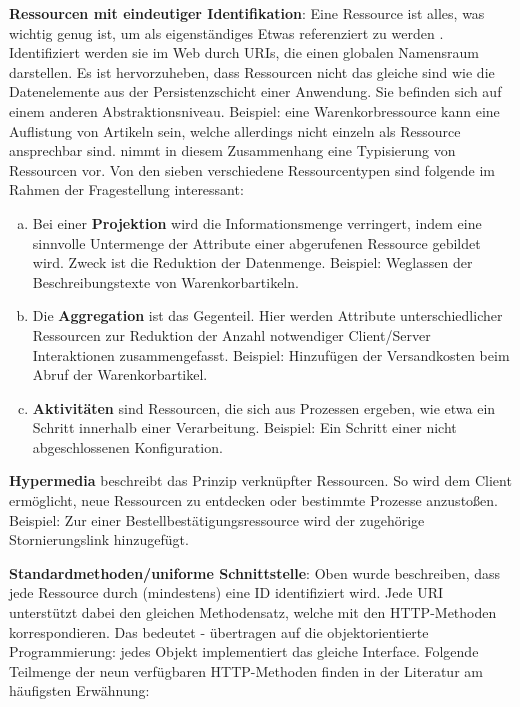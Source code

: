 \documentclass[12pt,a4paper,bibliography=totocnumbered,listof=totoc]{scrartcl}
\begin{document}
\begin{compactitem}
\item \textbf{Ressourcen mit eindeutiger Identifikation}: \glqq Eine Ressource ist alles, was wichtig genug ist, um als eigenständiges Etwas referenziert zu werden\grqq{} \citep{richardson07}. Identifiziert werden sie im Web durch URIs, die einen globalen Namensraum darstellen.  Es ist hervorzuheben, dass Ressourcen nicht das gleiche sind wie die Datenelemente aus der Persistenzschicht einer Anwendung. Sie befinden sich auf einem anderen Abstraktionsniveau. Beispiel: eine Warenkorbressource kann eine Auflistung von Artikeln sein, welche allerdings nicht einzeln als Ressource ansprechbar sind. \citeauthor{tilkov11} nimmt in diesem Zusammenhang eine Typisierung von Ressourcen vor. Von den sieben verschiedene Ressourcentypen sind folgende im Rahmen der Fragestellung interessant:
\begin{enumerate}[a.]
\item Bei einer \textbf{Projektion} wird die Informationsmenge verringert, indem eine sinnvolle Untermenge der Attribute einer abgerufenen Ressource gebildet wird. Zweck ist die Reduktion der Datenmenge. Beispiel: Weglassen der Beschreibungstexte von Warenkorbartikeln.
\item Die \textbf{Aggregation} ist das Gegenteil. Hier werden Attribute unterschiedlicher Ressourcen zur Reduktion der Anzahl notwendiger Client/Server Interaktionen zusammengefasst. Beispiel: Hinzufügen der Versandkosten beim Abruf der Warenkorbartikel.
\item \textbf{Aktivitäten} sind Ressourcen, die sich aus Prozessen ergeben, wie etwa ein Schritt innerhalb einer Verarbeitung. Beispiel: Ein Schritt einer nicht abgeschlossenen Konfiguration.
\end{enumerate}
\item \textbf{Hypermedia} beschreibt das Prinzip verknüpfter Ressourcen. So wird dem Client ermöglicht, neue Ressourcen zu entdecken oder bestimmte Prozesse anzustoßen. Beispiel: Zur einer Bestellbestätigungsressource wird der zugehörige Stornierungslink hinzugefügt.
\item \textbf{Standardmethoden/uniforme Schnittstelle}: Oben wurde beschreiben, dass jede Ressource durch (mindestens) eine ID identifiziert wird. Jede URI unterstützt dabei den gleichen Methodensatz, welche mit den HTTP-Methoden korrespondieren. Das bedeutet - übertragen auf die objektorientierte Programmierung: jedes Objekt implementiert das gleiche Interface. Folgende Teilmenge der neun verfügbaren HTTP-Methoden finden in der Literatur am häufigsten Erwähnung:

\end{compactitem}
\end{document}
